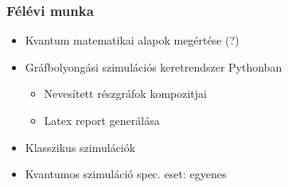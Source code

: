 \documentclass[aspectratio=169]{beamer}
\begin{document}
\begin{frame}
  \frametitle{Félévi munka}
  \begin{itemize}
    \item Kvantum matematikai alapok megértése (?)
    \item Gráfbolyongási szimulációs keretrendszer Pythonban
          \begin{itemize}
            \item Nevesített részgráfok kompozitjai
            \item Latex report generálása
          \end{itemize}
    \item Klasszikus szimulációk
    \item Kvantumos szimuláció spec. eset: egyenes
  \end{itemize}
\end{frame}
\end{document}
